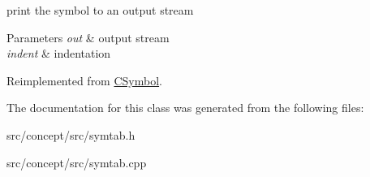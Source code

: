 print the symbol to an output stream 


\begin{DoxyParams}{Parameters}
{\em out} & output stream \\
\hline
{\em indent} & indentation \\
\hline
\end{DoxyParams}


Reimplemented from \hyperlink{classCSymbol_acf224e60939a51f6b5b1341db0274dbe}{C\-Symbol}.



The documentation for this class was generated from the following files\-:\begin{DoxyCompactItemize}
\item 
src/concept/src/symtab.\-h\item 
src/concept/src/symtab.\-cpp\end{DoxyCompactItemize}
